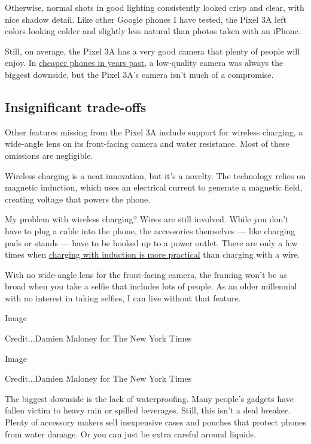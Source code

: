 Otherwise, normal shots in good lighting consistently looked crisp and
clear, with nice shadow detail. Like other Google phones I have tested,
the Pixel 3A left colors looking colder and slightly less natural than
photos taken with an iPhone.

Still, on average, the Pixel 3A has a very good camera that plenty of
people will enjoy. In
\href{https://www.nytimes3xbfgragh.onion/2018/02/28/technology/personaltech/cheaper-smartphone.html}{cheaper
phones in years past}, a low-quality camera was always the biggest
downside, but the Pixel 3A's camera isn't much of a compromise.

\hypertarget{insignificant-trade-offs}{%
\subsection{Insignificant trade-offs}\label{insignificant-trade-offs}}

Other features missing from the Pixel 3A include support for wireless
charging, a wide-angle lens on its front-facing camera and water
resistance. Most of these omissions are negligible.

Wireless charging is a neat innovation, but it's a novelty. The
technology relies on magnetic induction, which uses an electrical
current to generate a magnetic field, creating voltage that powers the
phone.

My problem with wireless charging? Wires are still involved. While you
don't have to plug a cable into the phone, the accessories themselves
--- like charging pads or stands --- have to be hooked up to a power
outlet. There are only a few times when
\href{https://www.nytimes3xbfgragh.onion/2018/10/03/technology/personaltech/wireless-charging-pros-cons.html}{charging
with induction is more practical} than charging with a wire.

With no wide-angle lens for the front-facing camera, the framing won't
be as broad when you take a selfie that includes lots of people. As an
older millennial with no interest in taking selfies, I can live without
that feature.

Image

Credit...Damien Maloney for The New York Times

Image

Credit...Damien Maloney for The New York Times

The biggest downside is the lack of waterproofing. Many people's gadgets
have fallen victim to heavy rain or spilled beverages. Still, this isn't
a deal breaker. Plenty of accessory makers sell inexpensive cases and
pouches that protect phones from water damage. Or you can just be extra
careful around liquids.

